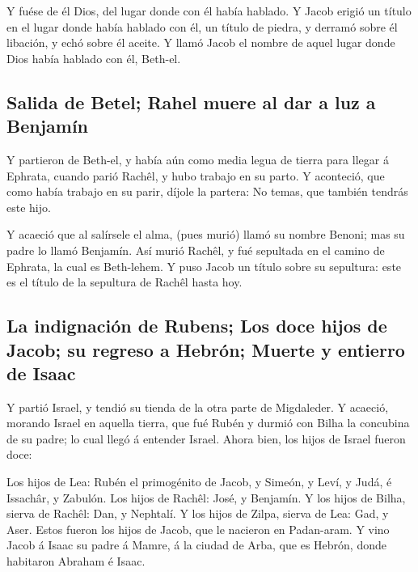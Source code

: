  Y fuése de él Dios, del lugar donde con él había
hablado.  Y Jacob erigió un título en el lugar donde
había hablado con él, un título de piedra, y derramó sobre él libación,
y echó sobre él aceite.  Y llamó Jacob el nombre de aquel
lugar donde Dios había hablado con él, Beth-el.

\hypertarget{salida-de-betel-rahel-muere-al-dar-a-luz-a-benjamuxedn}{%
\subsection{Salida de Betel; Rahel muere al dar a luz a
Benjamín}\label{salida-de-betel-rahel-muere-al-dar-a-luz-a-benjamuxedn}}

 Y partieron de Beth-el, y había aún como media legua de
tierra para llegar á Ephrata, cuando parió Rachêl, y hubo trabajo en su
parto.  Y aconteció, que como había trabajo en su parir,
díjole la partera: No temas, que también tendrás este hijo.

 Y acaeció que al salírsele el alma, (pues murió) llamó
su nombre Benoni; mas su padre lo llamó Benjamín.  Así
murió Rachêl, y fué sepultada en el camino de Ephrata, la cual es
Beth-lehem.  Y puso Jacob un título sobre su sepultura:
este es el título de la sepultura de Rachêl hasta hoy.

\hypertarget{la-indignaciuxf3n-de-rubens-los-doce-hijos-de-jacob-su-regreso-a-hebruxf3n-muerte-y-entierro-de-isaac}{%
\subsection{La indignación de Rubens; Los doce hijos de Jacob; su
regreso a Hebrón; Muerte y entierro de
Isaac}\label{la-indignaciuxf3n-de-rubens-los-doce-hijos-de-jacob-su-regreso-a-hebruxf3n-muerte-y-entierro-de-isaac}}

 Y partió Israel, y tendió su tienda de la otra parte de
Migdaleder.  Y acaeció, morando Israel en aquella tierra,
que fué Rubén y durmió con Bilha la concubina de su padre; lo cual llegó
á entender Israel. Ahora bien, los hijos de Israel fueron doce:

 Los hijos de Lea: Rubén el primogénito de Jacob, y
Simeón, y Leví, y Judá, é Issachâr, y Zabulón.  Los hijos
de Rachêl: José, y Benjamín.  Y los hijos de Bilha,
sierva de Rachêl: Dan, y Nephtalí.  Y los hijos de Zilpa,
sierva de Lea: Gad, y Aser. Estos fueron los hijos de Jacob, que le
nacieron en Padan-aram.  Y vino Jacob á Isaac su padre á
Mamre, á la ciudad de Arba, que es Hebrón, donde habitaron Abraham é
Isaac.

